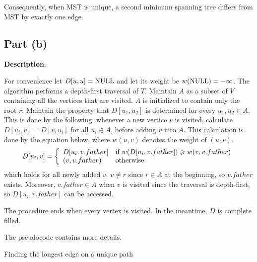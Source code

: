 \documentclass{article}
\begin{document}
Consequently, when MST is unique, a second minimum spanning tree differs from MST by exactly one edge.

\subsection{Part (b)}
\noindent\textbf{Description}:

For convenience let $D[u,u]=\textup{NULL}$ and let its weight be $w(\textup{NULL})=-\infty$. The algorithm performs a depth-first traversal of $T$. Maintain $A$ as a subset of $V$ containing all the vertices that are visited. $A$ is initialized to contain only the root $r$. Maintain the property that $D[u_1,u_2]$ is determined for every $u_1,u_2\in A$. This is done by the following: whenever a new vertice $v$ is visited, calculate $D[u_i,v]=D[v,u_i]$ for all $u_i\in A$, before adding $v$ into $A$. This calculation is done by the equation below, where $w(u,v)$ denotes the weight of $(u,v)$.
\begin{equation*}
D[u_i,v]=\left\{\begin{array}{ll}D[u_i,v.father]&\textup{if }w(D[u_i,v.father])\geqslant w(v,v.father)\\(v,v.father)&\textup{otherwise}\end{array}\right.
\end{equation*}
which holds for all newly added $v$. $v\neq r$ since $r\in A$ at the beginning, so $v.father$ exists. Moreover, $v.father\in A$ when $v$ is visited since the traversal is depth-first, so $D[u_i,v.father]$ can be accessed.

The procedure ends when every vertex is visited. In the meantime, $D$ is complete filled.

The pseudocode contains more details.
\begin{algorithm}
\caption{Finding the longest edge on a unique path}
\begin{algorithmic}[1]
\EndProcedure

	\Return{}
\Else{}
			\Else{}
			\EndIf
		\EndFor
	\EndFor
	\State\Return{}
\EndIf
\EndProcedure
\end{algorithmic}
\end{algorithm}
\end{document}
